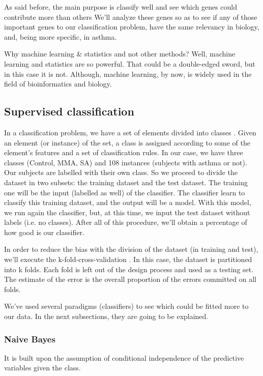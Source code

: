 \documentclass[conference,a4paper]{IEEEtran}
\begin{document}
As said before, the main purpose is classify well and see which genes could contribute more than others We'll analyze these genes so as to see if any of those important genes to our classification problem, have the same relevancy in biology, and, being more specific, in asthma.

Why machine learning \& statistics and not other methods? Well, machine learning and statistics are so powerful. That could be a double-edged sword, but in this case it is not. Although, machine learning, by now, is widely used in the field of bioinformatics and biology.

\subsection{Supervised classification}

In a classification problem, we have a set of elements divided into classes \cite{machineBioinfo}. Given an element (or instance) of the set, a class is assigned according to some of the element's features and a set of classification rules. In our case, we have three classes (Control, MMA, SA) and 108 instances (subjects with asthma or not). Our subjects are labelled with their own class. So we proceed to divide the dataset in two subsets: the training dataset and the test dataset. The training one will be the input (labelled as well) of the classifier. The classifier learn to classify this training dataset, and the output will be a model. With this model, we run again the classifier, but, at this time, we input the test dataset without labels (i.e. no classes). After all of this procedure, we'll obtain a percentage of how good is our classifier.

In order to reduce the bias with the division of the dataset (in training and test), we'll execute the k-fold-cross-validation \cite{CrossValidation}. In this case, the dataset is partitioned into k folds. Each fold is left out of the design process and used as a testing set. The estimate of the error is the overall proportion of the errors committed on all folds.

We've used several paradigms (classifiers) to see which could be fitted more to our data. In the next subsections, they are going to be explained.

\subsubsection{Naive Bayes}

It is built upon the assumption of conditional independence of the predictive variables given the class. 
\end{document}
